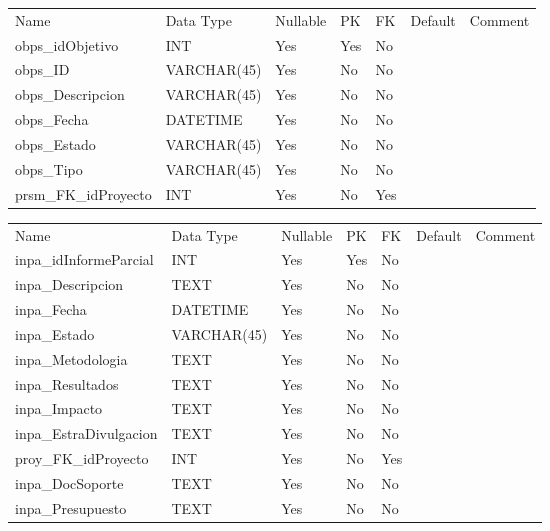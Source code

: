 			\begin{center}
				\begin{tabular}{ |l|l|l|l|l|l|l| }
					\hline
					Name & Data Type & Nullable & PK & FK & Default & Comment \\
					obps_idObjetivo & INT & Yes & Yes & No &  & \\ \hline 
obps_ID & VARCHAR(45) & Yes & No & No &  & \\ \hline 
obps_Descripcion & VARCHAR(45) & Yes & No & No &  & \\ \hline 
obps_Fecha & DATETIME & Yes & No & No &  & \\ \hline 
obps_Estado & VARCHAR(45) & Yes & No & No &  & \\ \hline 
obps_Tipo & VARCHAR(45) & Yes & No & No &  & \\ \hline 
prsm_FK_idProyecto & INT & Yes & No & Yes &  & \\ \hline 

				\end{tabular}
			\end{center}
		

			\begin{center}
				\begin{tabular}{ |l|l|l|l|l|l|l| }
					\hline
					Name & Data Type & Nullable & PK & FK & Default & Comment \\
					inpa_idInformeParcial & INT & Yes & Yes & No &  & \\ \hline 
inpa_Descripcion & TEXT & Yes & No & No &  & \\ \hline 
inpa_Fecha & DATETIME & Yes & No & No &  & \\ \hline 
inpa_Estado & VARCHAR(45) & Yes & No & No &  & \\ \hline 
inpa_Metodologia & TEXT & Yes & No & No &  & \\ \hline 
inpa_Resultados & TEXT & Yes & No & No &  & \\ \hline 
inpa_Impacto & TEXT & Yes & No & No &  & \\ \hline 
inpa_EstraDivulgacion & TEXT & Yes & No & No &  & \\ \hline 
proy_FK_idProyecto & INT & Yes & No & Yes &  & \\ \hline 
inpa_DocSoporte & TEXT & Yes & No & No &  & \\ \hline 
inpa_Presupuesto & TEXT & Yes & No & No &  & \\ \hline 

				\end{tabular}
			\end{center}
		

